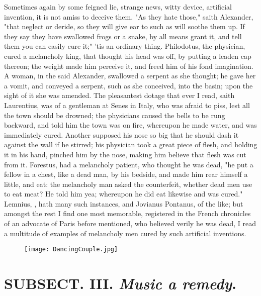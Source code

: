 {Sometimes again by some feigned lie, strange news, witty device, artificial invention, it is not amiss to deceive them. "As they hate those," saith Alexander, "that neglect or deride, so they will give ear to such as will soothe them up. If they say they have swallowed frogs or a snake, by all means grant it, and tell them you can easily cure it;" 'tis an ordinary thing. Philodotus, the physician, cured a melancholy king, that thought his head was off, by putting a leaden cap thereon; the weight made him perceive it, and freed him of his fond imagination. A woman, in the said Alexander, swallowed a serpent as she thought; he gave her a vomit, and conveyed a serpent, such as she conceived, into the basin; upon the sight of it she was amended. The pleasantest dotage that ever I read, saith Laurentius, was of a gentleman at Senes in Italy, who was afraid to piss, lest all the town should be drowned; the physicians caused the bells to be rung backward, and told him the town was on fire, whereupon he made water, and was immediately cured. Another supposed his nose so big that he should dash it against the wall if he stirred; his physician took a great piece of flesh, and holding it in his hand, pinched him by the nose, making him believe that flesh was cut from it. Forestus,  had a melancholy patient, who thought he was dead, "he put a fellow in a chest, like a dead man, by his bedside, and made him rear himself a little, and eat: the melancholy man asked the counterfeit, whether dead men use to eat meat? He told him yea; whereupon he did eat likewise and was cured." Lemnius, , hath many such instances, and Jovianus Pontanus,  of the like; but amongst the rest I find one most memorable, registered in the French chronicles of an advocate of Paris before mentioned, who believed verily he was dead, \etc{} I read a multitude of examples of melancholy men cured by such artificial inventions.

\cleartoleftpage{}
\begin{figure}[p]
  \begingroup
  \centering
  \texttt{[image: DancingCouple.jpg]}
  \label{fig:DancingCouple}
\end{figure}
\clearpage{}
\thispagestyle{titleontop}
\section{ SUBSECT. III. \emph{Music a remedy}.}

}
